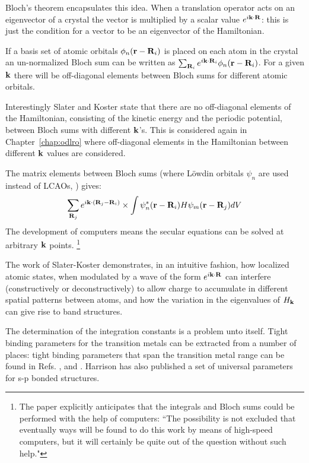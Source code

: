 Bloch's theorem encapsulates this idea. When a translation operator acts 
on an eigenvector of a crystal the vector is multiplied by a scalar
value $e^{i{\bf k}\cdot{\bf R}}$: this is just the condition for a vector to be an
eigenvector of the Hamiltonian.

If a basis set of atomic orbitals $\phi_{n}({\bf r}-{\bf R}_{i})$
is placed on each atom in the crystal an un-normalized Bloch sum can be 
written as $\sum_{{\bf R}_{i}} e^{i{\bf k}\cdot{\bf R}_{i}}\phi_{n}({\bf r}-{\bf R}_{i})$. For
a given ${\bf k}$ there will be off-diagonal elements between Bloch sums
for different atomic orbitals.

  Interestingly Slater and Koster state that there are no off-diagonal
elements of the Hamiltonian, consisting of the kinetic energy and the periodic potential, 
between Bloch sums with different ${\bf k}$'s. This is considered again in Chapter~\ref{chap:odlro}
where off-diagonal elements in the Hamiltonian between different ${\bf k}$ values are considered.

The matrix elements between Bloch sums (where L\"owdin orbitals $\psi_{n}$ are used instead of LCAOs, \cite{lowdin62}) gives:
%
\begin{equation}
\sum_{{\bf R}_{j}} e^{i{\bf k}\cdot({\bf R}_{j}-{\bf R}_{i})}\times\int \psi^{*}_{n}({\bf r}-{\bf R}_{i})H\psi_{m}({\bf r}-{\bf R}_{j})dV
\end{equation}
%
The development of computers means the secular equations can be solved 
at arbitrary ${\bf k}$ points. \footnote{The paper explicitly anticipates that the integrals and Bloch 
sums could be performed with the help of computers: ``The possibility is not excluded 
that eventually ways will be found to do this work by means of high-speed computers, but
it will certainly be quite out of the question without such help."} 

The work of Slater-Koster demonstrates, in an intuitive fashion, how localized atomic
states, when modulated by a wave of the form $e^{i{\bf k}\cdot{\bf R}}$ can interfere 
(constructively or deconstructively) to allow charge to accumulate in different 
spatial patterns between atoms, and how the variation in the eigenvalues of $H_{{\bf k}}$
can give rise to band structures.

The determination of the integration constants is a problem unto itself.
Tight binding parameters for the transition metals can be extracted from 
a number of places: tight binding parameters that span the transition
metal range can be found in Refs. \cite{nieminen76}, \cite{pettifor77} and \cite{jepsen75, andersen77, harrison80}.
Harrison has also published a set of universal parameters for s-p bonded structures.

